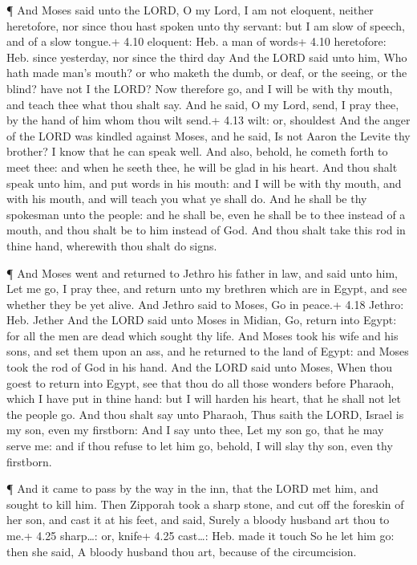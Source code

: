  ¶ And Moses said unto the LORD, O my Lord, I am not
eloquent, neither heretofore, nor since thou hast spoken unto thy
servant: but I am slow of speech, and of a slow tongue.+ 4.10 eloquent:
Heb. a man of words+ 4.10 heretofore: Heb. since yesterday, nor since
the third day  And the LORD said unto him, Who hath made
man's mouth? or who maketh the dumb, or deaf, or the seeing, or the
blind? have not I the LORD?  Now therefore go, and I will
be with thy mouth, and teach thee what thou shalt say.  And
he said, O my Lord, send, I pray thee, by the hand of him whom thou wilt
send.+ 4.13 wilt: or, shouldest  And the anger of the LORD
was kindled against Moses, and he said, Is not Aaron the Levite thy
brother? I know that he can speak well. And also, behold, he cometh
forth to meet thee: and when he seeth thee, he will be glad in his
heart.  And thou shalt speak unto him, and put words in his
mouth: and I will be with thy mouth, and with his mouth, and will teach
you what ye shall do.  And he shall be thy spokesman unto
the people: and he shall be, even he shall be to thee instead of a
mouth, and thou shalt be to him instead of God.  And thou
shalt take this rod in thine hand, wherewith thou shalt do signs.

 ¶ And Moses went and returned to Jethro his father in law,
and said unto him, Let me go, I pray thee, and return unto my brethren
which are in Egypt, and see whether they be yet alive. And Jethro said
to Moses, Go in peace.+ 4.18 Jethro: Heb. Jether  And the
LORD said unto Moses in Midian, Go, return into Egypt: for all the men
are dead which sought thy life.  And Moses took his wife
and his sons, and set them upon an ass, and he returned to the land of
Egypt: and Moses took the rod of God in his hand.  And the
LORD said unto Moses, When thou goest to return into Egypt, see that
thou do all those wonders before Pharaoh, which I have put in thine
hand: but I will harden his heart, that he shall not let the people go.
 And thou shalt say unto Pharaoh, Thus saith the LORD,
Israel is my son, even my firstborn:  And I say unto thee,
Let my son go, that he may serve me: and if thou refuse to let him go,
behold, I will slay thy son, even thy firstborn.

 ¶ And it came to pass by the way in the inn, that the LORD
met him, and sought to kill him.  Then Zipporah took a
sharp stone, and cut off the foreskin of her son, and cast it at his
feet, and said, Surely a bloody husband art thou to me.+ 4.25
sharp\ldots: or, knife+ 4.25 cast\ldots: Heb. made it touch
 So he let him go: then she said, A bloody husband thou
art, because of the circumcision.

